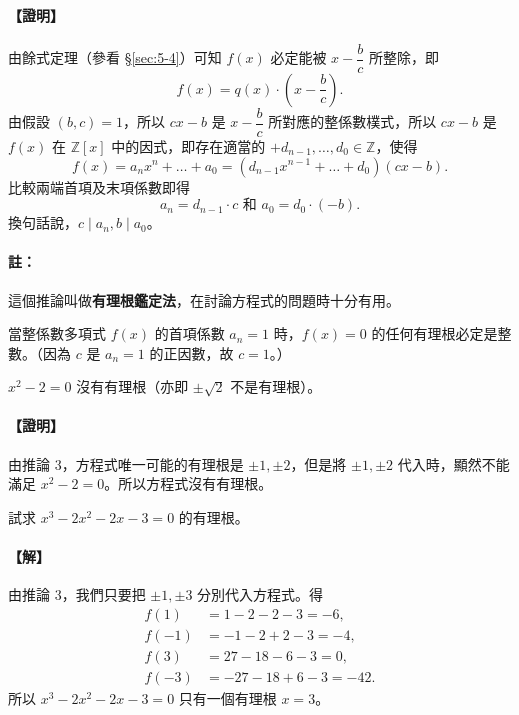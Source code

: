 \paragraph{【證明】}
由餘式定理（參看 \S\ref{sec:5-4}）可知 $f(x)$ 必定能被 $x-\dfrac{b}{c}$ 所整除，即
\begin{equation*}
  f(x) = q(x) \cdot \left(x-\frac{b}{c}\right).
\end{equation*}
由假設 $(b, c) = 1$，所以 $cx-b$ 是 $x-\dfrac{b}{c}$ 所對應的整係數樸式，所以 $cx-b$ 是 $f(x)$ 在 $\mathbb{Z}[x]$ 中的因式，即存在適當的 $+d_{n-1}, \dots, d_0 \in \mathbb{Z}$，使得
\begin{equation*}
  f(x) = a_n x^n + \dots + a_0 = (d_{n-1} x^{n-1} + \dots + d_0)(cx-b).
\end{equation*}
比較兩端首項及末項係數即得
\begin{equation*}
  a_n = d_{n-1} \cdot c \text{ 和 } a_0 = d_0 \cdot (-b).
\end{equation*}
換句話說，$c \mid a_n, b \mid a_0$。

\paragraph{註：}
這個推論叫做\textbf{有理根鑑定法}，在討論方程式的問題時十分有用。

\begin{corollary}\label{cor:monic_root}
當整係數多項式 $f(x)$ 的首項係數 $a_n = 1$ 時，$f(x) = 0$ 的任何有理根必定是整數。（因為 $c$ 是 $a_n = 1$ 的正因數，故 $c=1$。）
\end{corollary}

\begin{example}\label{ex:7-2-15}
$x^2-2 = 0$ 沒有有理根（亦即 $\pm\sqrt{2}$ 不是有理根）。

\paragraph{【證明】}
由推論 3，方程式唯一可能的有理根是 $\pm 1, \pm 2$，但是將 $\pm 1, \pm 2$ 代入時，顯然不能滿足 $x^2-2 = 0$。所以方程式沒有有理根。
\end{example}

\begin{example}\label{ex:7-2-16}
試求 $x^3-2x^2-2x-3 = 0$ 的有理根。

\paragraph{【解】}
由推論 3，我們只要把 $\pm 1, \pm 3$ 分別代入方程式。得
\begin{align*}
  f(1) &= 1-2-2-3 = -6, \\
  f(-1) &= -1-2+2-3 = -4, \\
  f(3) &= 27-18-6-3 = 0, \\
  f(-3) &= -27-18+6-3 = -42.
\end{align*}
所以 $x^3-2x^2-2x-3 = 0$ 只有一個有理根 $x=3$。
\end{example}

